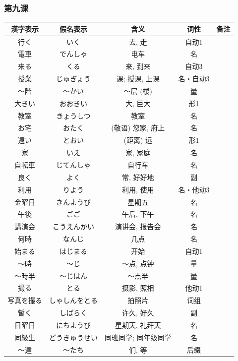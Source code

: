 \subsubsection{第九课}
\begin{longtable}{|c|c|c|c|c|}
    \hline
漢字表示 & 假名表示  & 含义 & 词性 & 备注 \\ \hline\hline  
行く & いく & 去, 走 & 自动1 & \\ \hline
電車 & でんしゃ & 电车 & 名 & \\ \hline
来る & くる & 来, 到来 & 自动3 & \\ \hline
授業 & じゅぎょう & 课; 授课, 上课 & 名・自动3 & \\ \hline
〜階 & 〜かい & 〜层 (楼) & 量 & \\ \hline
大きい & おおきい & 大, 巨大 & 形1 & \\ \hline
教室 & きょうしつ & 教室 & 名 & \\ \hline
お宅 & おたく & (敬语) 您家, 府上 & 名 & \\ \hline
遠い & とおい & (距离) 远 & 形1 & \\ \hline
家 & いえ & 家, 家庭 & 名 & \\ \hline
自転車 & じてんしゃ & 自行车 & 名 & \\ \hline
良く & よく & 常, 好好地 & 副 & \\ \hline
利用 & りよう & 利用, 使用 & 名・他动3 & \\ \hline
金曜日 & きんようび & 星期五 & 名 & \\ \hline
午後 & ごご & 午后, 下午 & 名 & \\ \hline
講演会 & こうえんかい & 演讲会, 报告会 & 名 & \\ \hline
何時 & なんじ & 几点 & 名 & \\ \hline
始まる & はじまる & 开始 & 自动1 & \\ \hline
〜時 & 〜じ & 〜点, 点钟 & 量 & \\ \hline
〜時半 & 〜じはん & 〜点半 & 量 & \\ \hline
撮る & とる & 摄影, 照相 & 他动1 & \\ \hline
写真を撮る & しゃしんをとる & 拍照片 & 词组 & \\ \hline
暫く & しばらく & 许久, 好久 & 副 & \\ \hline
日曜日 & にちようび & 星期天, 礼拜天 & 名 & \\ \hline
同級生 & どうきゅうせい & 同班同学; 同年级同学 & 名 & \\ \hline
〜達 & 〜たち & 们, 等 & 后缀 & \\ \hline

\end{longtable}
